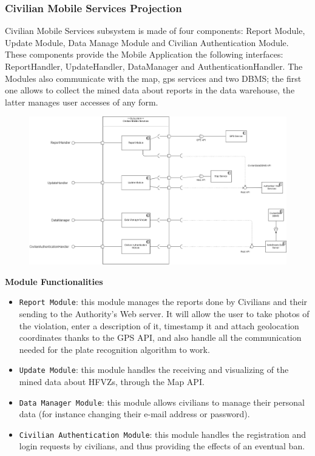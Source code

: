 \documentclass[12pt,a4paper]{article}
\begin{document}
\subsubsection{Civilian Mobile Services Projection}
Civilian Mobile Services subsystem is made of four components: Report Module, Update Module, Data Manage Module and Civilian Authentication Module.
These components provide the Mobile Application the following interfaces: ReportHandler, UpdateHandler, DataManager and AuthenticationHandler. The Modules also communicate with the map, gps services and two DBMS; the first one allows to collect the mined data about reports in the data warehouse, the latter manages user accesses of any form.
\begin{figure}[H]
				\centering
					\begin{adjustwidth}{-25mm}{-25mm}
					        \includegraphics[width=0.9\paperwidth]{Images/CivilianMobileServicesProjection}
					\end{adjustwidth}
			\end{figure}
\textbf{Module Functionalities}
\begin{itemize}
	\item \texttt{Report Module}: this module manages the reports done by Civilians and their sending to the Authority's Web server. It will allow the user to take photos of the violation, enter a description of it, timestamp it and attach geolocation coordinates thanks to the GPS API, and also handle all the communication needed for the plate recognition algorithm to work.
	\item \texttt{Update Module}: this module handles the receiving and visualizing of the mined data about HFVZs, through the Map API.
	\item \texttt{Data Manager Module}: this module allows civilians to manage their personal data (for instance changing their e-mail address or password).
	\item \texttt{Civilian Authentication Module}: this module handles the registration and login requests by civilians, and thus providing the effects of an eventual ban.
\end{itemize}
\newpage
\end{document}
